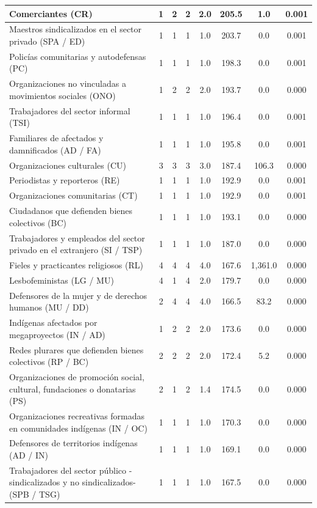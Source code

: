 \documentclass[letterpaper, 11pt]{book}
\theoremstyle{definition}
\theoremstyle{remark}
\begin{document}
{{{{{{{{{{\begin{footnotesize}
\begin{longtable}{|p{7cm}@{ }|@{ }c|@{ }c|@{ }c|@{ }c|@{ }c|@{ }c|@{ }c|}
Comerciantes (CR) & 1 & 2 & 2 & 2.0 & 205.5 & 1.0 & 0.001\\ \hline
Maestros sindicalizados en el sector privado (SPA / ED) & 1 & 1 & 1 & 1.0 & 203.7 & 0.0 & 0.001\\ \hline
Policías comunitarias y autodefensas (PC) & 1 & 1 & 1 & 1.0 & 198.3 & 0.0 & 0.001\\ \hline
Organizaciones no vinculadas a movimientos sociales (ONO) & 1 & 2 & 2 & 2.0 & 193.7 & 0.0 & 0.000\\ \hline
Trabajadores del sector informal (TSI) & 1 & 1 & 1 & 1.0 & 196.4 & 0.0 & 0.001\\ \hline
Familiares de afectados y damnificados (AD / FA) & 1 & 1 & 1 & 1.0 & 195.8 & 0.0 & 0.001\\ \hline
Organizaciones culturales (CU) & 3 & 3 & 3 & 3.0 & 187.4 & 106.3 & 0.000\\ \hline
Periodistas y reporteros (RE) & 1 & 1 & 1 & 1.0 & 192.9 & 0.0 & 0.001\\ \hline
Organizaciones comunitarias (CT) & 1 & 1 & 1 & 1.0 & 192.9 & 0.0 & 0.001\\ \hline
Ciudadanos que defienden bienes colectivos (BC) & 1 & 1 & 1 & 1.0 & 193.1 & 0.0 & 0.000\\ \hline
Trabajadores y empleados del sector privado en el extranjero (SI / TSP) & 1 & 1 & 1 & 1.0 & 187.0 & 0.0 & 0.000\\ \hline
Fieles y practicantes religiosos (RL) & 4 & 4 & 4 & 4.0 & 167.6 & 1,361.0 & 0.000\\ \hline
Lesbofeministas (LG / MU) & 4 & 1 & 4 & 2.0 & 179.7 & 0.0 & 0.000\\ \hline
Defensores de la mujer y de derechos humanos (MU / DD) & 2 & 4 & 4 & 4.0 & 166.5 & 83.2 & 0.000\\ \hline
Indígenas afectados por megaproyectos (IN / AD) & 1 & 2 & 2 & 2.0 & 173.6 & 0.0 & 0.000\\ \hline
Redes plurares que defienden bienes colectivos (RP / BC) & 2 & 2 & 2 & 2.0 & 172.4 & 5.2 & 0.000\\ \hline
Organizaciones de promoción social, cultural, fundaciones o donatarias (PS) & 2 & 1 & 2 & 1.4 & 174.5 & 0.0 & 0.000\\ \hline
Organizaciones recreativas formadas en comunidades indígenas (IN / OC) & 1 & 1 & 1 & 1.0 & 170.3 & 0.0 & 0.000\\ \hline
Defensores de territorios indígenas (AD / IN) & 1 & 1 & 1 & 1.0 & 169.1 & 0.0 & 0.000\\ \hline
Trabajadores del sector público -sindicalizados y no sindicalizados- (SPB / TSG) & 1 & 1 & 1 & 1.0 & 167.5 & 0.0 & 0.000\\ \hline

\end{longtable}
\end{footnotesize}}}}}}}}}}}
\end{document}
